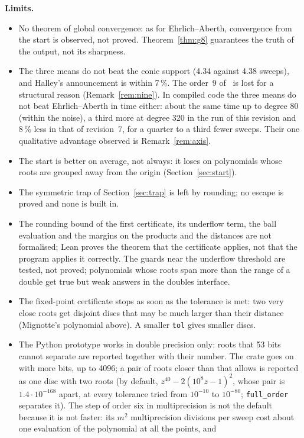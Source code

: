 \documentclass[10pt,a4paper]{article}
\theoremstyle{definition}
\numberwithin{equation}{section}
\begin{document}
\textbf{Limits.}
\begin{itemize}
\item No theorem of global convergence: as for Ehrlich--Aberth, convergence from the start
 is observed, not proved. Theorem~\ref{thm:g8} guarantees the truth of the output, not its
 sharpness.
\item The three means do not beat the conic support (4.34 against 4.38 sweeps), and Halley's
 announcement is within 7\,\%. The order~9 of~\cite{v29} is lost for a structural reason
 (Remark~\ref{rem:nine}). In compiled code the three means do not beat Ehrlich--Aberth in time either:
 about the same time up to degree 80 (within the noise), a third more at degree 320 in the run of
 this revision and 8\,\% less in that of revision~7, for a quarter to a third fewer sweeps. Their one
 qualitative advantage observed is Remark~\ref{rem:axis}.
\item The start is better on average, not always: it loses on polynomials whose roots are grouped
 away from the origin (Section~\ref{sec:start}).
\item The symmetric trap of Section~\ref{sec:trap} is left by rounding; no escape is proved and none
 is built in.
\item The rounding bound of the first certificate, its underflow term, the ball evaluation and the
 margins on the products and the distances are not formalised; Lean proves the theorem that the
 certificate applies, not that the program applies it correctly. The guards near the underflow
 threshold are tested, not proved; polynomials whose roots span more than the range of a double get
 true but weak answers in the doubles interface.
\item The fixed-point certificate stops as soon as the tolerance is met: two very close roots get
 disjoint discs that may be much larger than their distance (Mignotte's polynomial above). A smaller
 \texttt{tol} gives smaller discs.
\item The Python prototype works in double precision only: roots that 53 bits cannot separate are
 reported together with their number. The crate goes on with more bits, up to 4096; a pair of roots
 closer than that allows is reported as one disc with two roots (by default, $z^{40}-2(10^8z-1)^2$, whose pair is
 $1.4\cdot10^{-168}$ apart, at every tolerance tried from $10^{-10}$ to $10^{-80}$; \texttt{full\_order}
 separates it).
 The step of order six in multiprecision is not the default because it is not faster: its $m^2$
 multiprecision divisions per sweep cost about one evaluation of the polynomial at all the points, and

\end{itemize}
\end{document}

